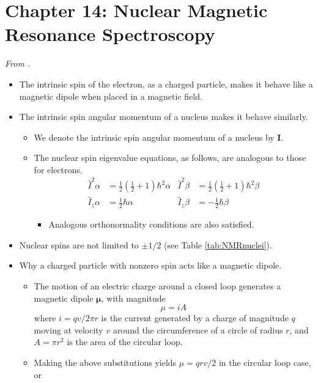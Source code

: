 \documentclass[../notes.tex]{subfiles}
\begin{document}
\section{Chapter 14: Nuclear Magnetic Resonance Spectroscopy}
\emph{From \textcite{bib:McQuarrieSimon}.}
\begin{itemize}
    \item {}The intrinsic spin of the electron, as a charged particle, makes it behave like a magnetic dipole when placed in a magnetic field.
    \item The intrinsic spin angular momentum of a nucleus makes it behave similarly.
    \begin{itemize}
        \item We denote the intrinsic spin angular momentum of a nucleus by $\bm{I}$.
        \item The nuclear spin eigenvalue equations, as follows, are analogous to those for electrons.
        \begin{align*}
            \hat{I}^2\alpha &= \tfrac{1}{2}(\tfrac{1}{2}+1)\hbar^2\alpha&
                \hat{I}^2\beta &= \tfrac{1}{2}(\tfrac{1}{2}+1)\hbar^2\beta\\
            \hat{I}_z\alpha &= \tfrac{1}{2}\hbar\alpha&
                \hat{I}_z\beta &= -\tfrac{1}{2}\hbar\beta
        \end{align*}
        \begin{itemize}
            \item Analogous orthonormality conditions are also satisfied.
        \end{itemize}
    \end{itemize}
    \item Nuclear spins are not limited to $\pm 1/2$ (see Table \ref{tab:NMRnuclei}).
    \item Why a charged particle with nonzero spin acts like a magnetic dipole.
    \begin{itemize}
        \item The motion of an electric charge around a closed loop generates a magnetic dipole $\bm{\mu}$, with magnitude
        \begin{equation*}
            \mu = iA
        \end{equation*}
        where $i=qv/2\pi r$ is the current generated by a charge of magnitude $q$ moving at velocity $v$ around the circumference of a circle of radius $r$, and $A=\pi r^2$ is the area of the circular loop.
        \item Making the above substitutions yields $\mu=qrv/2$ in the circular loop case, or

\end{itemize}
\end{itemize}
\end{document}
